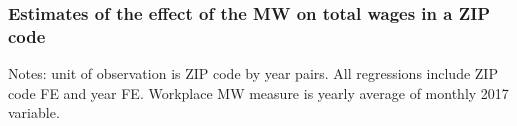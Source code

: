 \documentclass[aspectratio=169, t]{beamer}
\begin{document}
\begin{frame}[label = wages_results]
    \frametitle{Estimates of the effect of the MW on total wages in a ZIP code}

    \vspace{2mm}
    
    
    \vspace{2mm}
    {\footnotesize
    Notes: unit of observation is ZIP code by year pairs. 
    All regressions include ZIP code FE and year FE.
    Workplace MW measure is yearly average of monthly 2017 variable.}

    \vspace{2mm}
    \hyperlink{share_pocketed_model}{}
\end{frame}
\end{document}
